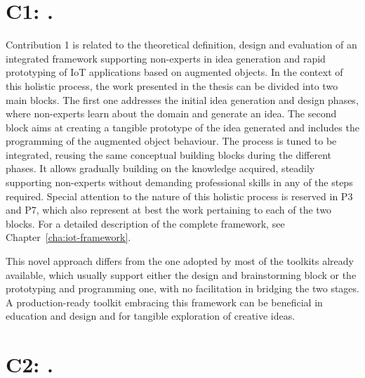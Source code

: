 \section[C1: \Ci][Contribution 1]{C1: \Ci.}
\label{c1}

Contribution 1 is related to the theoretical definition, design and evaluation of an integrated framework supporting non-experts in idea generation and rapid prototyping of IoT applications based on augmented objects. In the context of this holistic process, the work presented in the thesis can be divided into two main blocks. The first one addresses the initial idea generation and design phases, where non-experts learn about the domain and generate an idea. The second block aims at creating a tangible prototype of the idea generated and includes the programming of the augmented object behaviour.
The process is tuned to be integrated, reusing the same conceptual building blocks during the different phases. It allows gradually building on the knowledge acquired, steadily supporting non-experts without demanding professional skills in any of the steps required. Special attention to the nature of this holistic process is reserved in P3 and P7, which also represent at best the work pertaining to each of the two blocks. For a detailed description of the complete framework, see Chapter~\ref{cha:iot-framework}.

This novel approach differs from the one adopted by most of the toolkits already available, which usually support either the design and brainstorming block or the prototyping and programming one, with no facilitation in bridging the two stages. A production-ready toolkit embracing this framework can be beneficial in education and design and for tangible exploration of creative ideas.


\section[C2: \Cii][Contribution 2]{C2: \Cii.}
\label{c2}

